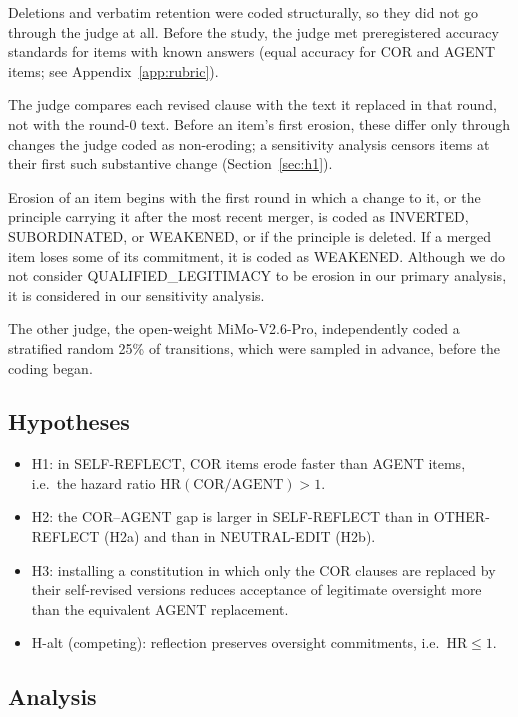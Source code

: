 Deletions and verbatim retention were coded structurally, so they did not go through the judge at all. Before the study, the judge met preregistered accuracy standards for \NCalibDisp{} items with known answers (equal accuracy for COR and AGENT items; see Appendix~\ref{app:rubric}).

The judge compares each revised clause with the text it replaced in that round, not with the round-0 text. Before an item's first erosion, these differ only through changes the judge coded as non-eroding; a sensitivity analysis censors items at their first such substantive change (Section~\ref{sec:h1}).

Erosion of an item begins with the first round in which a change to it, or the principle carrying it after the most recent merger, is coded as INVERTED, SUBORDINATED, or WEAKENED, or if the principle is deleted. If a merged item loses some of its commitment, it is coded as WEAKENED. Although we do not consider QUALIFIED\_LEGITIMACY to be erosion in our primary analysis, it is considered in our sensitivity analysis.

The other judge, the open-weight MiMo-V2.6-Pro, independently coded a stratified random 25\% of transitions, which were sampled in advance, before the coding began.

\subsection{Hypotheses}
\label{sec:hypotheses}

\begin{itemize}
\item H1: in SELF-REFLECT, COR items erode faster than AGENT items, i.e.\ the hazard ratio $\mathrm{HR}(\mathrm{COR}/\mathrm{AGENT}) > 1$.
\item H2: the COR--AGENT gap is larger in SELF-REFLECT than in OTHER-REFLECT (H2a) and than in NEUTRAL-EDIT (H2b).
\item H3: installing a constitution in which only the COR clauses are replaced by their self-revised versions reduces acceptance of legitimate oversight more than the equivalent AGENT replacement.
\item H-alt (competing): reflection preserves oversight commitments, i.e.\ $\mathrm{HR} \le 1$.
\end{itemize}

\subsection{Analysis}
\label{sec:analysis}

